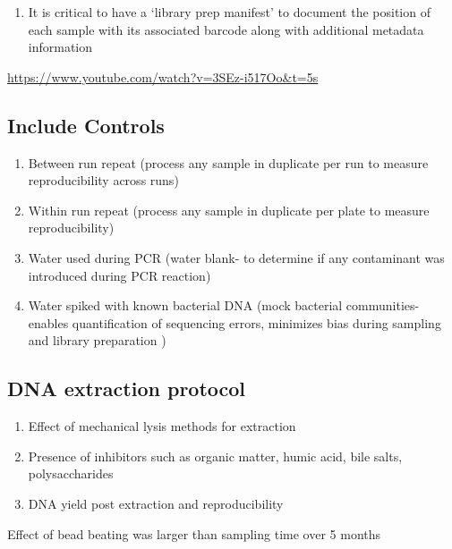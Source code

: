 \documentclass[
]{book}
\providecommand{\tightlist}{%
  \setlength{\itemsep}{0pt}\setlength{\parskip}{0pt}}
\begin{document}
\begin{enumerate}
\def\labelenumi{\arabic{enumi}.}
\setcounter{enumi}{1}
\tightlist
\item
  It is critical to have a `library prep manifest' to document the position of each sample with its associated barcode along with additional metadata information
\end{enumerate}

\url{https://www.youtube.com/watch?v=3SEz-i517Oo\&t=5s}

\hypertarget{include-controls}{%
\subsection{Include Controls}\label{include-controls}}

\begin{enumerate}
\def\labelenumi{\arabic{enumi}.}
\tightlist
\item
  Between run repeat (process any sample in duplicate per run to measure reproducibility across runs)
\item
  Within run repeat (process any sample in duplicate per plate to measure reproducibility)
\item
  Water used during PCR (water blank- to determine if any contaminant was introduced during PCR reaction)
\item
  Water spiked with known bacterial DNA (mock bacterial communities- enables quantification of sequencing errors, minimizes bias during sampling and library preparation )
\end{enumerate}

\hypertarget{dna-extraction-protocol}{%
\subsection{DNA extraction protocol}\label{dna-extraction-protocol}}

\begin{enumerate}
\def\labelenumi{\arabic{enumi}.}
\tightlist
\item
  Effect of mechanical lysis methods for extraction
\item
  Presence of inhibitors such as organic matter, humic acid, bile salts, polysaccharides
\item
  DNA yield post extraction and reproducibility
\end{enumerate}

Effect of bead beating was larger than sampling time over 5 months
\end{document}
